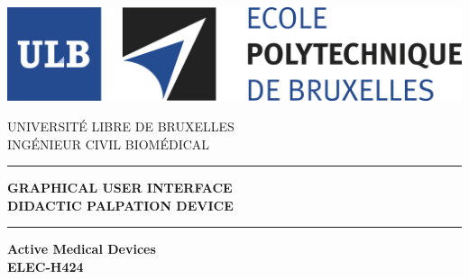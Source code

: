 \documentclass[11pt, a4paper]{article}  %
\title{}
\author{}
\date{}
\begin{document}
\begin{center}

	\includegraphics[scale=0.75]{images/logos/ulb_ecole_polytechnique_de_bruxelles.jpg}\\
	
    \vspace{1.5cm}
    \begin{Large}
	    UNIVERSITÉ LIBRE DE BRUXELLES\\
	    \vspace{1 cm}
	    INGÉNIEUR CIVIL BIOMÉDICAL\\ 
    \end{Large}
    \vspace{1.5 cm}
    
    \hrule
    
    \vspace{1.5cm}
    \begin{huge}
	    \textbf{
    	        GRAPHICAL USER INTERFACE\\
    	        DIDACTIC PALPATION DEVICE\\
    	        }
    \end{huge}
    \vspace{1.5cm}
    
    \hrule
    
    \vspace{1.5 cm}
    \begin{large}
        \textbf{
                Active Medical Devices\\
                ELEC-H424
                }
    \end{large}
    
    
	

\end{center}
\end{document}
